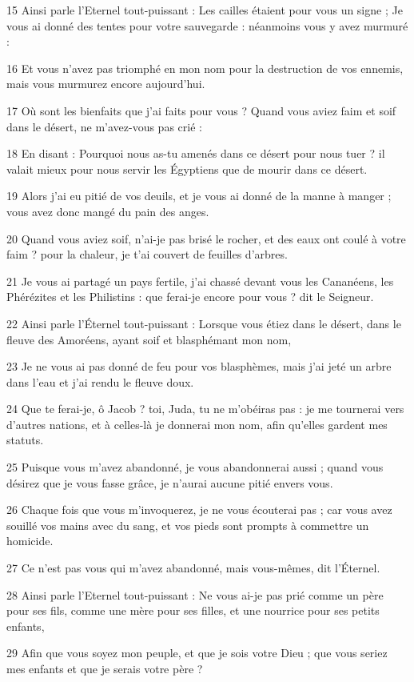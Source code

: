 \par 15 Ainsi parle l'Eternel tout-puissant : Les cailles étaient pour vous un signe ; Je vous ai donné des tentes pour votre sauvegarde : néanmoins vous y avez murmuré :
\par 16 Et vous n'avez pas triomphé en mon nom pour la destruction de vos ennemis, mais vous murmurez encore aujourd'hui.
\par 17 Où sont les bienfaits que j'ai faits pour vous ? Quand vous aviez faim et soif dans le désert, ne m'avez-vous pas crié :
\par 18 En disant : Pourquoi nous as-tu amenés dans ce désert pour nous tuer ? il valait mieux pour nous servir les Égyptiens que de mourir dans ce désert.
\par 19 Alors j'ai eu pitié de vos deuils, et je vous ai donné de la manne à manger ; vous avez donc mangé du pain des anges.
\par 20 Quand vous aviez soif, n'ai-je pas brisé le rocher, et des eaux ont coulé à votre faim ? pour la chaleur, je t'ai couvert de feuilles d'arbres.
\par 21 Je vous ai partagé un pays fertile, j'ai chassé devant vous les Cananéens, les Phérézites et les Philistins : que ferai-je encore pour vous ? dit le Seigneur.
\par 22 Ainsi parle l'Éternel tout-puissant : Lorsque vous étiez dans le désert, dans le fleuve des Amoréens, ayant soif et blasphémant mon nom,
\par 23 Je ne vous ai pas donné de feu pour vos blasphèmes, mais j'ai jeté un arbre dans l'eau et j'ai rendu le fleuve doux.
\par 24 Que te ferai-je, ô Jacob ? toi, Juda, tu ne m'obéiras pas : je me tournerai vers d'autres nations, et à celles-là je donnerai mon nom, afin qu'elles gardent mes statuts.
\par 25 Puisque vous m'avez abandonné, je vous abandonnerai aussi ; quand vous désirez que je vous fasse grâce, je n'aurai aucune pitié envers vous.
\par 26 Chaque fois que vous m'invoquerez, je ne vous écouterai pas ; car vous avez souillé vos mains avec du sang, et vos pieds sont prompts à commettre un homicide.
\par 27 Ce n'est pas vous qui m'avez abandonné, mais vous-mêmes, dit l'Éternel.
\par 28 Ainsi parle l'Eternel tout-puissant : Ne vous ai-je pas prié comme un père pour ses fils, comme une mère pour ses filles, et une nourrice pour ses petits enfants,
\par 29 Afin que vous soyez mon peuple, et que je sois votre Dieu ; que vous seriez mes enfants et que je serais votre père ?
